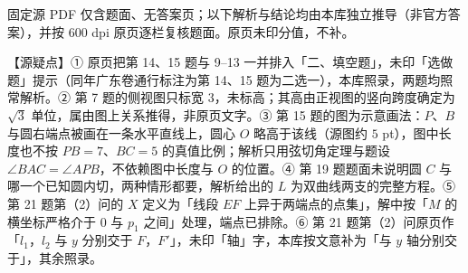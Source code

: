 

\begin{gktip}
固定源 PDF 仅含题面、无答案页；以下解析与结论均由本库独立推导（非官方答案），并按 600 dpi 原页逐栏复核题面。原页未印分值，不补。

【源疑点】① 原页把第 14、15 题与 9–13 一并排入「二、填空题」，未印「选做题」提示（同年广东卷通行标注为第 14、15 题为二选一），本库照录，两题均照常解析。② 第 7 题的侧视图只标宽 $3$，未标高；其高由正视图的竖向跨度确定为 $\sqrt3$ 单位，属由图上关系推得，非原页文字。③ 第 15 题的图为示意画法：$P$、$B$ 与圆右端点被画在一条水平直线上，圆心 $O$ 略高于该线（源图约 $5$ pt），图中长度也不按 $PB=7$、$BC=5$ 的真值比例；解析只用弦切角定理与题设 $\angle BAC=\angle APB$，不依赖图中长度与 $O$ 的位置。④ 第 19 题题面未说明圆 $C$ 与哪一个已知圆内切，两种情形都要，解析给出的 $L$ 为双曲线两支的完整方程。⑤ 第 21 题第（2）问的 $X$ 定义为「线段 $EF$ 上异于两端点的点集」，解中按「$M$ 的横坐标严格介于 $0$ 与 $p_1$ 之间」处理，端点已排除。⑥ 第 21 题第（2）问原页作「$l_1$，$l_2$ 与 $y$ 分别交于 $F$，$F'$」，未印「轴」字，本库按文意补为「与 $y$ 轴分别交于」，其余照录。
\end{gktip}


